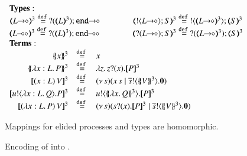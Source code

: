 \begin{figure}[t]
$
{%
\begin{array}{rcl}
	\multicolumn{3}{l}{{\bf Types:}}
	\\
	\multicolumn{3}{c}{\tmap{\shot{L}}{3} \defeq \shot{\btinp{\tmap{L}{3}} \tinact}
	\qquad \qquad
	\tmap{\btout{\shot{L}} S}{3} \defeq \btout{\tmap{\shot{L}}{3}} \tmap{S}{3}}
	\\
	\multicolumn{3}{c}{\tmap{\lhot{L}}{3} \defeq \lhot{\btinp{\tmap{L}{3}} \tinact}
	\qquad \qquad \tmap{\btinp{\shot{L}} S}{3} \defeq \btinp{\tmap{\shot{L}}{3}} \tmap{S}{3}}
	\\
	\multicolumn{3}{l}{{\bf Terms:}}
		\\
	\auxmap{x}{3} & \defeq & x
	\\
	\auxmap{\abs{x: L}{P}}{3} & \defeq & \abs{z}{\binp{z}{x} \pmap{P}{3}}
	\\
	\pmap{\appl{(x:L)}{V}}{3} &\defeq& \newsp{s}{\appl{x}{s} \Par \bout{\dual{s}}{\auxmap{V}{3}} \inact}
	 \\
	\pmap{\bout{u}{\abs{x: L}{Q}} P}{3} & \defeq &\bout{u}{\auxmap{\abs{x}{Q}}{3} } \pmap{P}{3}
	\\
	\pmap{\appl{(\abs{x: L}{P})}{V}}{3} & \defeq &\newsp{s}{\binp{s}{x} \pmap{P}{3} \Par  \bout{\dual{s}}{\auxmap{V}{3}} \inact}
\end{array}
}
$

Mappings for elided processes and types are homomorphic.

\caption{\label{f:enc:hopip_to_hopi} Encoding of \HOpp into \HOp.}
\end{figure} 
